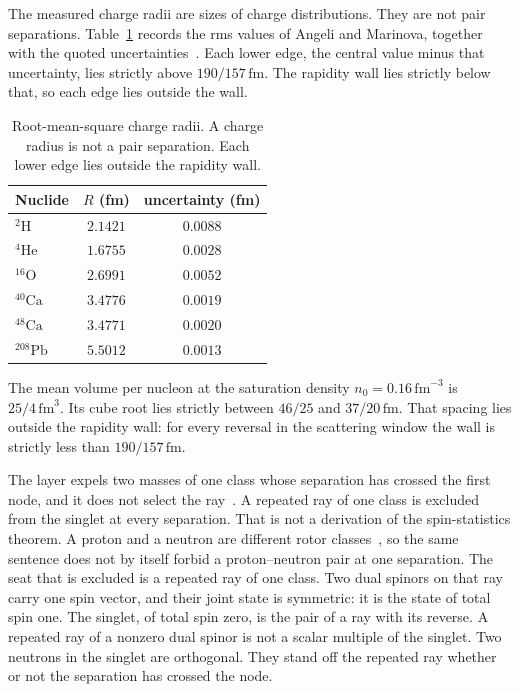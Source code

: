 \documentclass[a4paper]{article}
\begin{document}
The measured charge radii are sizes of charge distributions. They are not pair separations. Table~\ref{tab:radii} records the rms values of Angeli and Marinova, together with the quoted uncertainties~\cite{angeli2013}. Each lower edge, the central value minus that uncertainty, lies strictly above \(190/157\,\mathrm{fm}\). The rapidity wall lies strictly below that, so each edge lies outside the wall.

\begin{table}[htbp]
\centering
\caption{Root-mean-square charge radii. A charge radius is not a pair separation. Each lower edge lies outside the rapidity wall.}
\label{tab:radii}
\begin{tabular}{lcc}
\hline
Nuclide & \(R\) (fm) & uncertainty (fm) \\
\hline
\({}^{2}\mathrm{H}\) & \(2.1421\) & \(0.0088\) \\
\({}^{4}\mathrm{He}\) & \(1.6755\) & \(0.0028\) \\
\({}^{16}\mathrm{O}\) & \(2.6991\) & \(0.0052\) \\
\({}^{40}\mathrm{Ca}\) & \(3.4776\) & \(0.0019\) \\
\({}^{48}\mathrm{Ca}\) & \(3.4771\) & \(0.0020\) \\
\({}^{208}\mathrm{Pb}\) & \(5.5012\) & \(0.0013\) \\
\hline
\end{tabular}
\end{table}

The mean volume per nucleon at the saturation density \(n_0=0.16\,\mathrm{fm}^{-3}\) is \(25/4\,\mathrm{fm}^{3}\). Its cube root lies strictly between \(46/25\) and \(37/20\,\mathrm{fm}\). That spacing lies outside the rapidity wall: for every reversal in the scattering window the wall is strictly less than \(190/157\,\mathrm{fm}\).

The layer expels two masses of one class whose separation has crossed the first node, and it does not select the ray~\cite{dst-main}. A repeated ray of one class is excluded from the singlet at every separation. That is not a derivation of the spin-statistics theorem. A proton and a neutron are different rotor classes~\cite{dst-dio}, so the same sentence does not by itself forbid a proton--neutron pair at one separation. The seat that is excluded is a repeated ray of one class. Two dual spinors on that ray carry one spin vector, and their joint state is symmetric: it is the state of total spin one. The singlet, of total spin zero, is the pair of a ray with its reverse. A repeated ray of a nonzero dual spinor is not a scalar multiple of the singlet. Two neutrons in the singlet are orthogonal. They stand off the repeated ray whether or not the separation has crossed the node.
\end{document}
